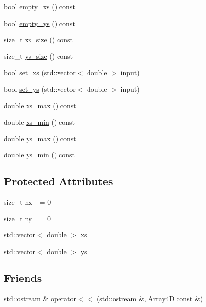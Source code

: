 \begin{DoxyCompactItemize}
bool \mbox{\hyperlink{class_array4_d_a66b2635ff1ce8ef57e9c55bba8e2bbda}{empty\+\_\+xs}} () const
\item 
bool \mbox{\hyperlink{class_array4_d_a40d87667978c6824f536367dcffbac39}{empty\+\_\+ys}} () const
\item 
size\+\_\+t \mbox{\hyperlink{class_array4_d_a440c545fcf694923767581f590d808df}{xs\+\_\+size}} () const
\item 
size\+\_\+t \mbox{\hyperlink{class_array4_d_a7c08ac86562c729d9fa24165cba55a97}{ys\+\_\+size}} () const
\item 
bool \mbox{\hyperlink{class_array4_d_a92afa660eb005779a0c2cf602aa4c6fe}{set\+\_\+xs}} (std\+::vector$<$ double $>$ input)
\item 
bool \mbox{\hyperlink{class_array4_d_a03ed88518d6991a55f3e48ad7de15d73}{set\+\_\+ys}} (std\+::vector$<$ double $>$ input)
\item 
double \mbox{\hyperlink{class_array4_d_a4668c9767181db6bd228e054a3f81696}{xs\+\_\+max}} () const
\item 
double \mbox{\hyperlink{class_array4_d_a642efdce56ea7ffaf7e24ed1d63b3151}{xs\+\_\+min}} () const
\item 
double \mbox{\hyperlink{class_array4_d_a1e142285afbb8b00662d8f77f0b92b80}{ys\+\_\+max}} () const
\item 
double \mbox{\hyperlink{class_array4_d_af27f181faf93d0ca96e65b1e5bdab82d}{ys\+\_\+min}} () const
\end{DoxyCompactItemize}
\subsection*{Protected Attributes}
\begin{DoxyCompactItemize}
\item 
size\+\_\+t \mbox{\hyperlink{class_array4_d_a5fa707d43fe236f8890dae010de99bf1}{nx\+\_\+}} = 0
\item 
size\+\_\+t \mbox{\hyperlink{class_array4_d_a0c3053b1362730bb52d2d6e9c4402099}{ny\+\_\+}} = 0
\item 
std\+::vector$<$ double $>$ \mbox{\hyperlink{class_array4_d_a6fdbbc14cbe18e25f68ec9773df18783}{xs\+\_\+}}
\item 
std\+::vector$<$ double $>$ \mbox{\hyperlink{class_array4_d_aa9277734c8de6f2a02e6b06ccccbdaad}{ys\+\_\+}}
\end{DoxyCompactItemize}
\subsection*{Friends}
\begin{DoxyCompactItemize}
\item 
std\+::ostream \& \mbox{\hyperlink{class_array4_d_af0c2770deee0bf3f3fc90fc3ea22147c}{operator$<$$<$}} (std\+::ostream \&, \mbox{\hyperlink{class_array4_d}{Array4D}} const \&)
\end{DoxyCompactItemize}


